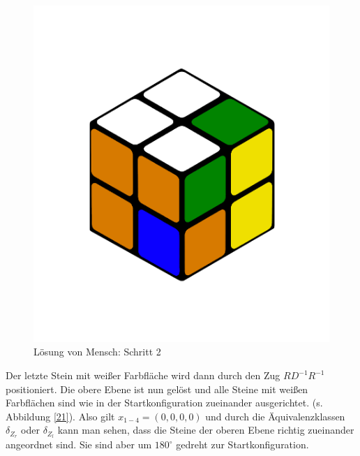 \documentclass[12pt,a4paper, usenames, dvipsnames]{article}
\begin{document}
\begin{figure}[h]
\centering
\includegraphics[scale=0.12]{menschSchritt2.png}
\caption[Lösung von Mensch: Schritt 2]{Lösung von Mensch: Schritt 2}
\label{20}
\end{figure}

Der letzte Stein mit weißer Farbfläche wird dann durch den Zug $RD^{-1}R^{-1}$ positioniert. Die obere Ebene ist nun gelöst und alle Steine mit weißen Farbflächen sind wie in der Startkonfiguration zueinander ausgerichtet. (s. Abbildung \ref{21}).
Also gilt $x_{1-4} = (0,0,0,0)$ und durch die Äquivalenzklassen $\delta_{Z_r}$ oder $\delta_{Z_l}$ kann man sehen, dass die Steine der oberen Ebene richtig zueinander angeordnet sind. Sie sind aber um $180^\circ$ gedreht zur Startkonfiguration. 
\end{document}
